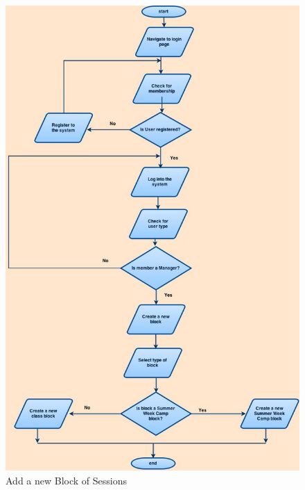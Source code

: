 \documentclass{l3proj}
\begin{document}
\pagebreak

{
\begin{figure}[h]
\caption{Add a new Block of Sessions}
\centering
\includegraphics[scale=0.30]{Manager(AddBlock).jpg}
\end{figure}
}

\pagebreak
\end{document}
